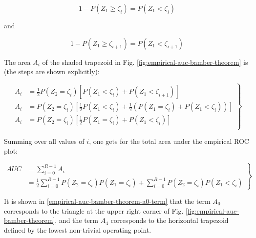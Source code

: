 \documentclass[
]{book}
\begin{document}
\begin{equation}
1-P\left ( Z_1 \geq \zeta_i \right )=P\left ( Z_1 < \zeta_i \right )
\label{eq:empirical-auc-bamber-theorem-proof3}
\end{equation}

and

\begin{equation}
1-P\left ( Z_1 \geq \zeta_{i+1} \right )=P\left ( Z_1 < \zeta_{i+1} \right )
\label{eq:empirical-auc-bamber-theorem-proof4}
\end{equation}

The area \(A_i\) of the shaded trapezoid in Fig. \ref{fig:empirical-auc-bamber-theorem} is (the steps are shown explicitly):

\begin{equation}
\left.
\begin{aligned}
A_i &=\frac{1}{2}P\left ( Z_2 = \zeta_i \right )\left [ P\left ( Z_1 < \zeta_i \right ) +  P\left ( Z_1 < \zeta_{i+1} \right ) \right ] \\
A_i &=P\left ( Z_2 = \zeta_i \right )\left [ \frac{1}{2}P\left ( Z_1 < \zeta_i \right ) +  \frac{1}{2} \left (P\left ( Z_1 = \zeta_i \right ) + P\left ( Z_1 < \zeta_i \right ) \right ) \right ]\\
A_i &=P\left ( Z_2 = \zeta_i \right )\left [ \frac{1}{2} P\left ( Z_1 = \zeta_i \right ) +  P\left ( Z_1 < \zeta_i \right ) \right ] \\
\end{aligned}
\right \}
\label{eq:empirical-auc-bamber-theorem-proof5}
\end{equation}

Summing over all values of \(i\), one gets for the total area under the empirical ROC plot:

\begin{equation}
\left.
\begin{aligned}
AUC & = \sum_{i=0}^{R-1}A_i\\
 & = \frac{1}{2}\sum_{i=0}^{R-1}P\left ( Z_2=\zeta_i \right )P\left ( Z_1=\zeta_i \right )+\sum_{i=0}^{R-1}P\left ( Z_2=\zeta_i \right )P\left ( Z_1<\zeta_i \right )
\end{aligned}
\right \}
\label{eq:empirical-auc-bamber-theorem-proof6}
\end{equation}

It is shown in \ref{empirical-auc-bamber-theorem-a0-term} that the term \(A_0\) corresponds to the triangle at the upper right corner of Fig. \ref{fig:empirical-auc-bamber-theorem}, and the term \(A_4\) corresponds to the horizontal trapezoid defined by the lowest non-trivial operating point.
\end{document}

